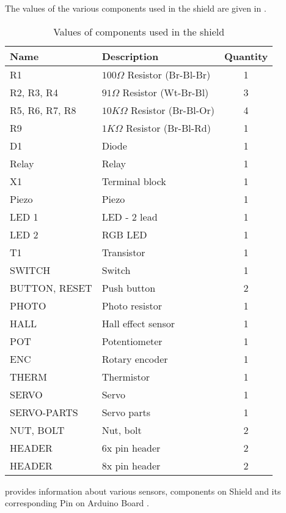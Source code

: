 The values of the various components used in the shield are given in 
.  
\begin{table}
\centering
\caption{Values of components used in the shield}
\label{tab:shield-values}
\begin{tabular}{|l|l|c|} \hline
Name & Description & Quantity \\ \hline
R1 & $100\Omega$ Resistor (Br-Bl-Br) & 1 \\ 
R2, R3, R4 & $91\Omega$ Resistor (Wt-Br-Bl) & 3 \\
R5, R6, R7, R8 & $10K\Omega$ Resistor (Br-Bl-Or) & 4 \\
R9 & $1K\Omega$ Resistor (Br-Bl-Rd) & 1 \\
D1 & Diode & 1 \\
Relay & Relay & 1 \\
X1 & Terminal block & 1 \\
Piezo & Piezo & 1 \\ 
LED 1 & LED - 2 lead & 1 \\
LED 2 & RGB LED & 1 \\
T1 & Transistor & 1 \\
SWITCH & Switch & 1 \\
BUTTON, RESET & Push button & 2 \\
PHOTO & Photo resistor & 1 \\
HALL & Hall effect sensor & 1 \\
POT & Potentiometer & 1 \\
ENC & Rotary encoder & 1 \\
THERM & Thermistor & 1 \\
SERVO & Servo & 1 \\
SERVO-PARTS & Servo parts & 1 \\
NUT, BOLT & Nut, bolt & 2 \\
HEADER & 6x pin header & 2 \\
HEADER & 8x pin header & 2 \\
\hline
\end{tabular}
\end{table}
 provides information about various sensors,
components on Shield and its corresponding Pin on Arduino Board
\cite{shield-ref}.  
